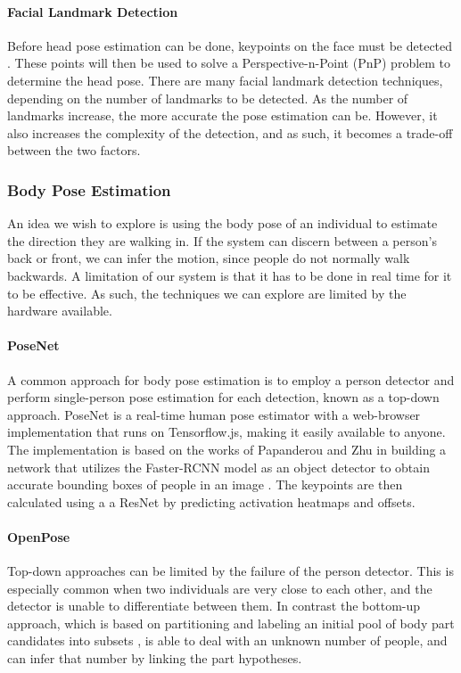 \paragraph{Facial Landmark Detection}
Before head pose estimation can be done, keypoints on the face must be detected \cite{Kazemi2014}. These points will then be used to solve a Perspective-n-Point (PnP) problem to determine the head pose. There are many facial landmark detection techniques, depending on the number of landmarks to be detected. As the number of landmarks increase, the more accurate the pose estimation can be. However, it also increases the complexity of the detection, and as such, it becomes a trade-off between the two factors.

\subsubsection{Body Pose Estimation}
An idea we wish to explore is using the body pose of an individual to estimate the direction they are walking in. If the system can discern between a person's back or front, we can infer the motion, since people do not normally walk backwards. A limitation of our system is that it has to be done in real time for it to be effective. As such, the techniques we can explore are limited by the hardware available.

\paragraph{PoseNet} A common approach for body pose estimation is to employ a person detector and perform single-person pose estimation for each detection, known as a top-down approach. PoseNet is a real-time human pose estimator with a web-browser implementation that runs on Tensorflow.js, making it easily available to anyone. The implementation is based on the works of Papanderou and Zhu \cite{Papandreou2017} in building a network that utilizes the Faster-RCNN model as an object detector to obtain accurate bounding boxes of people in an image \cite{Ren2017}. The keypoints are then calculated using a a ResNet \cite{He2016} by predicting activation heatmaps and offsets.

\paragraph{OpenPose} Top-down approaches can be limited by the failure of the person detector. This is especially common when two individuals are very close to each other, and the detector is unable to differentiate between them. In contrast the bottom-up approach, which is based on partitioning and labeling an initial pool of body part candidates into subsets \cite{Pishchulin}, is able to deal with an unknown number of people, and can infer that number by linking the part hypotheses.

